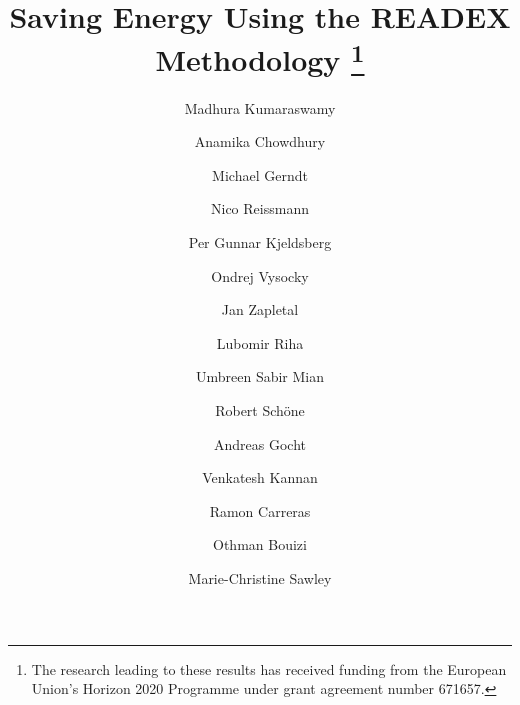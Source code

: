 \documentclass[runningheads]{llncs}
\begin{document}
%
\title{Saving Energy Using the READEX Methodology \thanks{The research leading to these results has received funding from the European Union's Horizon 2020 Programme under grant agreement number 671657.}}
%
%
\author{Madhura Kumaraswamy  \and Anamika Chowdhury  \and Michael Gerndt  \and
Nico Reissmann  \and Per Gunnar Kjeldsberg  \and
Ondrej Vysocky  \and Jan Zapletal  \and Lubomir Riha 
\and Umbreen Sabir Mian  \and Robert Sch\"one  \and Andreas Gocht  \and
Venkatesh Kannan  \and Ramon Carreras  \and 
Othman Bouizi  \and Marie-Christine Sawley }
%
%

\maketitle              %
\end{document}
